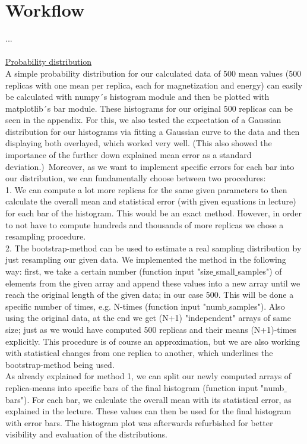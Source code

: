 \documentclass[11pt, letterpaper, onecolumn]{article}
\begin{document}
	\section{Workflow}
	...
	\\
	\\
	\underline{Probability distribution} \\
	A simple probability distribution for our calculated data of 500 mean values (500 replicas with one mean per replica, each for magnetization and energy) can easily be calculated with numpy´s histogram module and then be plotted with matplotlib´s bar module. These histograms for our original 500 replicas can be seen in the appendix. For this, we also tested the expectation of a Gaussian distribution for our histograms via fitting a Gaussian curve to the data and then displaying both overlayed, which worked very well. (This also showed the importance of the further down explained mean error as a standard deviation.)\
	Moreover, as we want to implement specific errors for each bar into our distribution, we can fundamentally choose between two procedures: \\
	1. We can compute a lot more replicas for the same given parameters to then calculate the overall mean and statistical error (with given equations in lecture) for each bar of the histogram. This would be an exact method. However, in order to not have to compute hundreds and thousands of more replicas we chose a resampling procedure. \\
	2. The bootstrap-method can be used to estimate a real sampling distribution by just resampling our given data. We implemented the method in the following way: first, we take a certain number (function input "size$\_$small$\_$samples") of elements from the given array and append these values into a new array until we reach the original length of the given data; in our case 500. This will be done a specific number of times, e.g. N-times (function input "numb$\_$samples"). Also using the original data, at the end we get (N+1) "independent" arrays of same size; just as we would have computed 500 replicas and their means (N+1)-times explicitly. This procedure is of course an approximation, but we are also working with statistical changes from one replica to another, which underlines the bootstrap-method being used. 
	\\
	As already explained for method 1, we can split our newly computed arrays of replica-means into specific bars of the final histogram (function input "numb$\_$bars"). For each bar, we calculate the overall mean with its statistical error, as explained in the lecture. These values can then be used for the final histogram with error bars. The histogram plot was afterwards refurbished for better visibility and evaluation of the distributions.
\end{document}

